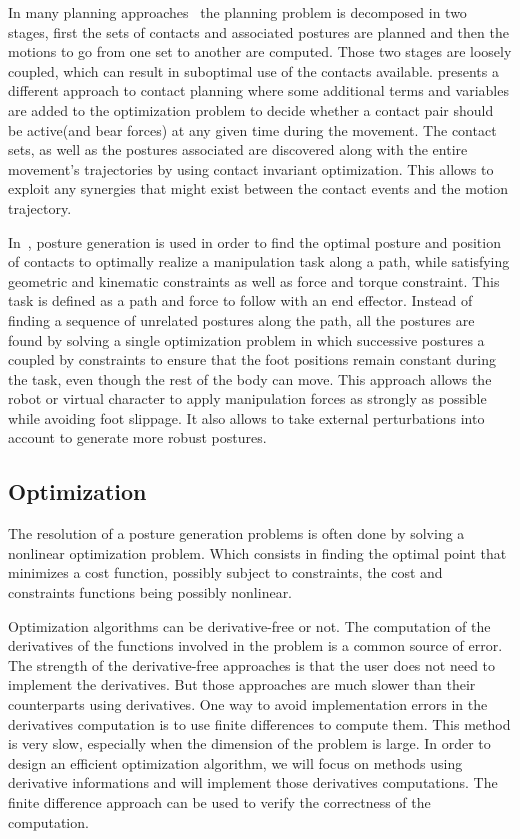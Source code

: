 In many planning approaches~\cite{kuffner2005motion, chestnutt2007navigation, hauser:ijrr:2008, kolter2008control, bouyarmane:icra:2011} the planning problem is decomposed in two stages, first the sets of contacts and associated postures are planned and then the motions to go from one set to another are computed.
Those two stages are loosely coupled, which can result in suboptimal use of the contacts available.
\cite{mordatch:acm:2012} presents a different approach to contact planning where some additional terms and variables are added to the optimization problem to decide whether a contact pair should be active(and bear forces) at any given time during the movement.
The contact sets, as well as the postures associated are discovered along with the entire movement's trajectories by using contact invariant optimization.
This allows to exploit any synergies that might exist between the contact events and the motion trajectory.

In~\cite{liu:acm:2012}, posture generation is used in order to find the optimal posture and position of contacts to optimally realize a manipulation task along a path, while satisfying geometric and kinematic constraints as well as force and torque constraint.
This task is defined as a path and force to follow with an end effector.
Instead of finding a sequence of unrelated postures along the path, all the postures are found by solving a single optimization problem in which successive postures a coupled by constraints to ensure that the foot positions remain constant during the task, even though the rest of the body can move.
This approach allows the robot or virtual character to apply manipulation forces as strongly as possible while avoiding foot slippage.
It also allows to take external perturbations into account to generate more robust postures.




\subsection{Optimization}
\label{sub:optimization}

The resolution of a posture generation problems is often done by solving a nonlinear optimization problem.
Which consists in finding the optimal point that minimizes a cost function, possibly subject to constraints, the cost and constraints functions being possibly nonlinear.

Optimization algorithms can be derivative-free or not.
The computation of the derivatives of the functions involved in the problem is a common source of error.
The strength of the derivative-free approaches is that the user does not need to implement the derivatives.
But those approaches are much slower than their counterparts using derivatives.
One way to avoid implementation errors in the derivatives computation is to use finite differences to compute them.
This method is very slow, especially when the dimension of the problem is large.
In order to design an efficient optimization algorithm, we will focus on methods using derivative informations and will implement those derivatives computations.
The finite difference approach can be used to verify the correctness of the computation.

